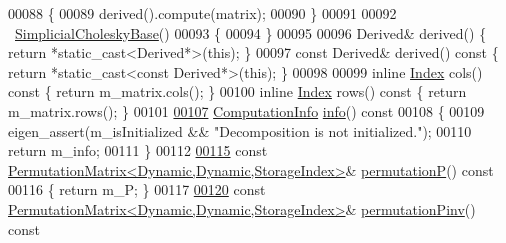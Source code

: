 \begin{DoxyCode}
00088     \{
00089       derived().compute(matrix);
00090     \}
00091 
00092     ~\hyperlink{group___sparse_cholesky___module_class_eigen_1_1_simplicial_cholesky_base}{SimplicialCholeskyBase}()
00093     \{
00094     \}
00095 
00096     Derived& derived() \{ \textcolor{keywordflow}{return} *\textcolor{keyword}{static\_cast<}Derived*\textcolor{keyword}{>}(\textcolor{keyword}{this}); \}
00097     \textcolor{keyword}{const} Derived& derived()\textcolor{keyword}{ const }\{ \textcolor{keywordflow}{return} *\textcolor{keyword}{static\_cast<}\textcolor{keyword}{const }Derived*\textcolor{keyword}{>}(\textcolor{keyword}{this}); \}
00098     
00099     \textcolor{keyword}{inline} \hyperlink{namespace_eigen_a62e77e0933482dafde8fe197d9a2cfde}{Index} cols()\textcolor{keyword}{ const }\{ \textcolor{keywordflow}{return} m\_matrix.cols(); \}
00100     \textcolor{keyword}{inline} \hyperlink{namespace_eigen_a62e77e0933482dafde8fe197d9a2cfde}{Index} rows()\textcolor{keyword}{ const }\{ \textcolor{keywordflow}{return} m\_matrix.rows(); \}
00101     
\hyperlink{group___sparse_cholesky___module_a3ac877f73aaaff670e6ae7554eb02fc8}{00107}     \hyperlink{group__enums_ga85fad7b87587764e5cf6b513a9e0ee5e}{ComputationInfo} \hyperlink{group___sparse_cholesky___module_a3ac877f73aaaff670e6ae7554eb02fc8}{info}()\textcolor{keyword}{ const}
00108 \textcolor{keyword}{    }\{
00109       eigen\_assert(m\_isInitialized && \textcolor{stringliteral}{"Decomposition is not initialized."});
00110       \textcolor{keywordflow}{return} m\_info;
00111     \}
00112     
\hyperlink{group___sparse_cholesky___module_aff1480e595a21726beaec9a586a94d5a}{00115}     \textcolor{keyword}{const} \hyperlink{group___core___module}{PermutationMatrix<Dynamic,Dynamic,StorageIndex>}& 
      \hyperlink{group___sparse_cholesky___module_aff1480e595a21726beaec9a586a94d5a}{permutationP}()\textcolor{keyword}{ const}
00116 \textcolor{keyword}{    }\{ \textcolor{keywordflow}{return} m\_P; \}
00117     
\hyperlink{group___sparse_cholesky___module_a0e23d1f4a88c211be7098faf1cb41674}{00120}     \textcolor{keyword}{const} \hyperlink{group___core___module}{PermutationMatrix<Dynamic,Dynamic,StorageIndex>}& 
      \hyperlink{group___sparse_cholesky___module_a0e23d1f4a88c211be7098faf1cb41674}{permutationPinv}()\textcolor{keyword}{ const}

\end{DoxyCode}
